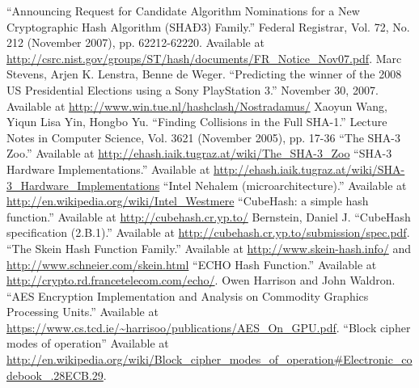 \documentclass{article}
\begin{document}
\begin{thebibliography}{9}
   ``Announcing Request for Candidate Algorithm Nominations for a New Cryptographic Hash Algorithm (SHAÐ3) Family.'' Federal Registrar, Vol. 72, No. 212 (November 2007), pp. 62212-62220. Available at \url{http://csrc.nist.gov/groups/ST/hash/documents/FR_Notice_Nov07.pdf}.
   Marc Stevens, Arjen K. Lenstra, Benne de Weger. ``Predicting the winner of the 2008 US Presidential Elections using a Sony PlayStation 3.'' November 30, 2007. Available at \url{http://www.win.tue.nl/hashclash/Nostradamus/}
   Xaoyun Wang, Yiqun Lisa Yin, Hongbo Yu. ``Finding Collisions in the Full SHA-1.'' Lecture Notes in Computer Science, Vol. 3621 (November 2005), pp. 17-36
   ``The SHA-3 Zoo.'' Available at \url{http://ehash.iaik.tugraz.at/wiki/The_SHA-3_Zoo}
   ``SHA-3 Hardware Implementations.'' Available at \url{http://ehash.iaik.tugraz.at/wiki/SHA-3_Hardware_Implementations}
   ``Intel Nehalem (microarchitecture).'' Available at \url{http://en.wikipedia.org/wiki/Intel_Westmere}
   ``CubeHash: a simple hash function.'' Available at \url{http://cubehash.cr.yp.to/}
   Bernstein, Daniel J. ``CubeHash specification (2.B.1).'' Available at \url{http://cubehash.cr.yp.to/submission/spec.pdf}.
   ``The Skein Hash Function Family.'' Available at \url{http://www.skein-hash.info/} and \url{http://www.schneier.com/skein.html}
   ``ECHO Hash Function.'' Available at \url{http://crypto.rd.francetelecom.com/echo/}.
   Owen Harrison and John Waldron. ``AES Encryption Implementation and Analysis on Commodity Graphics Processing Units.'' Available at \url{https://www.cs.tcd.ie/~harrisoo/publications/AES_On_GPU.pdf}.
   ``Block cipher modes of operation'' Available at \url{http://en.wikipedia.org/wiki/Block_cipher_modes_of_operation#Electronic_codebook_.28ECB.29}.
\end{thebibliography}
\end{document}
